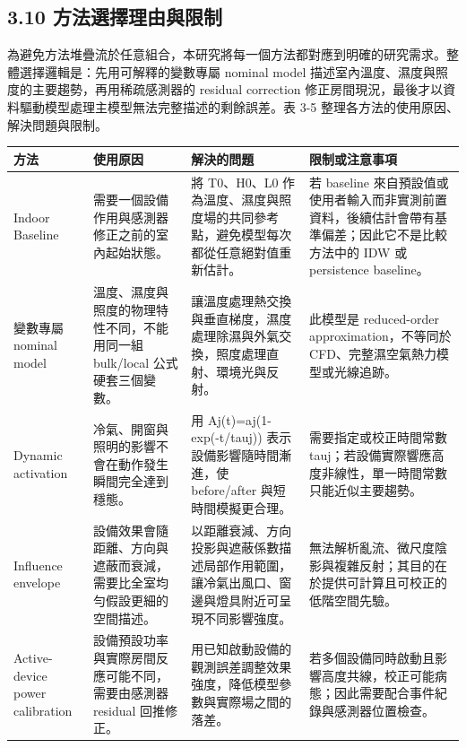 \documentclass[12pt,a4paper]{article}
\begin{document}
\subsection*{3.10 方法選擇理由與限制}

為避免方法堆疊流於任意組合，本研究將每一個方法都對應到明確的研究需求。整體選擇邏輯是：先用可解釋的變數專屬 nominal model 描述室內溫度、濕度與照度的主要趨勢，再用稀疏感測器的 residual correction 修正房間現況，最後才以資料驅動模型處理主模型無法完整描述的剩餘誤差。表 3-5 整理各方法的使用原因、解決問題與限制。


\begin{table}[htbp]
\centering
\footnotesize
\renewcommand{\arraystretch}{1.25}
\begin{tabular}{|>{\raggedright\arraybackslash}p{}|>{\raggedright\arraybackslash}p{}|>{\raggedright\arraybackslash}p{}|>{\raggedright\arraybackslash}p{}|}
\hline
\textbf{方法} & \textbf{使用原因} & \textbf{解決的問題} & \textbf{限制或注意事項} \\
\hline
Indoor Baseline & 需要一個設備作用與感測器修正之前的室內起始狀態。 & 將 T0、H0、L0 作為溫度、濕度與照度場的共同參考點，避免模型每次都從任意絕對值重新估計。 & 若 baseline 來自預設值或使用者輸入而非實測前置資料，後續估計會帶有基準偏差；因此它不是比較方法中的 IDW 或 persistence baseline。 \\
\hline
變數專屬 nominal model & 溫度、濕度與照度的物理特性不同，不能用同一組 bulk/local 公式硬套三個變數。 & 讓溫度處理熱交換與垂直梯度，濕度處理除濕與外氣交換，照度處理直射、環境光與反射。 & 此模型是 reduced-order approximation，不等同於 CFD、完整濕空氣熱力模型或光線追跡。 \\
\hline
Dynamic activation & 冷氣、開窗與照明的影響不會在動作發生瞬間完全達到穩態。 & 用 Aj(t)=aj(1-exp(-t/tauj)) 表示設備影響隨時間漸進，使 before/after 與短時間模擬更合理。 & 需要指定或校正時間常數 tauj；若設備實際響應高度非線性，單一時間常數只能近似主要趨勢。 \\
\hline
Influence envelope & 設備效果會隨距離、方向與遮蔽而衰減，需要比全室均勻假設更細的空間描述。 & 以距離衰減、方向投影與遮蔽係數描述局部作用範圍，讓冷氣出風口、窗邊與燈具附近可呈現不同影響強度。 & 無法解析亂流、微尺度陰影與複雜反射；其目的在於提供可計算且可校正的低階空間先驗。 \\
\hline
Active-device power calibration & 設備預設功率與實際房間反應可能不同，需要由感測器 residual 回推修正。 & 用已知啟動設備的觀測誤差調整效果強度，降低模型參數與實際場之間的落差。 & 若多個設備同時啟動且影響高度共線，校正可能病態；因此需要配合事件紀錄與感測器位置檢查。 \\

\end{tabular}
\end{table}
\end{document}
